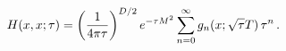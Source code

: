 \begin{equation}
  \label{eq:seeley}
H(x,x;\tau) = \left( {1 \over 4 \pi \tau} \right)^{D/2} e^{-\tau M^2}
\sum\limits_{n =0}^\infty g_n(x;\sqrt{\tau} T) \, \tau^n  \,.
\end{equation}

